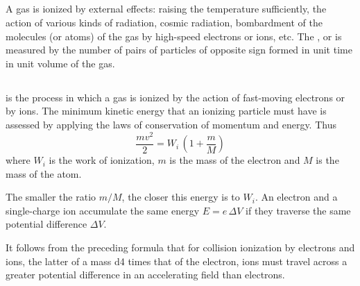 \subsection{}\label{22.4.4} A gas is ionized by external effects: raising the temperature sufficiently, the action of various kinds of radiation, cosmic radiation, bombardment of the molecules (or atoms) of the gas by high-speed electrons or ions, etc. The , or  is measured by the number of pairs of particles of opposite sign formed in unit time in unit volume of the gas. 

\subsection{}\label{22.4.5}  is the process in which a gas is ionized by the action of fast-moving electrons or by ions. The minimum kinetic energy  that an ionizing particle must have is assessed by applying the laws of conservation of momentum and energy. Thus
\begin{equation*}%
\frac{mv^{2}}{2} = W_{i} \, \left( 1 + \frac{m}{M}\right)
\end{equation*}
where $W_{i}$ is the work of ionization, $m$ is the mass of the electron and $M$ is the mass of the atom.

The smaller the ratio $m/M$, the closer this energy is to $W_{i}$. An electron and a single-charge ion accumulate the same energy $E =e \, \Delta V$ if they traverse the same potential difference $\Delta V$.

It follows from the preceding formula that for collision ionization by electrons and ions, the latter of a mass \num{d4} times that of the electron, ions must travel across a greater potential difference in an accelerating field than electrons.

